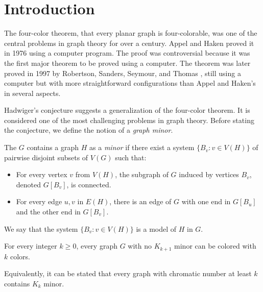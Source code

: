 \chapter{Introduction}

The four-color theorem, that every planar graph is four-colorable, was one of the central problems
in graph theory for over a century. Appel and Haken proved it in 1976 \cite{appel_haken_1977} using a computer program.
The proof was controversial because it was the first major theorem to be proved using a computer.
The theorem was later proved in 1997 by Robertson, Sanders, Seymour, and Thomas \cite{ROBERTSON19972},
still using a computer but with more straightforward configurations than Appel and Haken's in several aspects. 

Hadwiger's conjecture \cite{hadwiger_1943} suggests a generalization of the four-color theorem. It is considered one of 
the most challenging problems in graph theory. Before stating the conjecture, we define the notion of a \textit{graph minor}.

\begin{defn}[Minor]
    The $G$ contains a graph $H$ as a \textit{minor} if there exist a system $\{B_v : v \in V(H)\}$ of pairwise disjoint subsets of $V(G)$
    such that:
       \begin{itemize}
           \item For every vertex $v$ from $V(H)$, the subgraph of $G$ induced by vertices $B_v$, denoted $G[B_v]$, is connected.
           \item For every edge $u,v$ in $E(H)$, there is an edge of $G$ with one end in $G[B_u]$ and the other end in $G[B_v]$.
       \end{itemize} 

       We say that the system $\{B_v : v \in V(H)\}$ is a model of $H$ in $G$.
\end{defn}

\begin{conj} 
 For every integer $k \geq 0$, every graph $G$ with no $K_{k+1}$ minor can be colored with $k$ colors.
\end{conj}

Equivalently, it can be stated that every graph with chromatic number at least $k$ contains $K_k$ minor.


